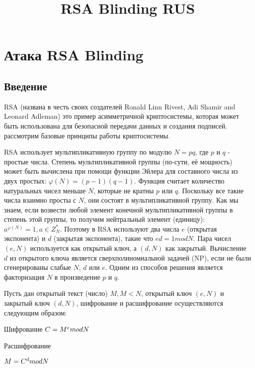 \documentclass[11pt]{article}
\title{RSA Blinding RUS}
\begin{document}
    
    \maketitle
    
    

    
    \section{Атака RSA
Blinding}\label{ux430ux442ux430ux43aux430-rsa-blinding}

\subsection{Введение}\label{ux432ux432ux435ux434ux435ux43dux438ux435}

RSA (названа в честь своих создателей Ronald Linn Rivest, Adi Shamir and
Leonard Adleman) это пример асимметричной криптосистемы, которая может
быть использована для безопасной передачи данных и создания подписей.
рассмотрим базовые принципы работы криптосистемы.

RSA использует мультипликативную группу по модулю \(N=pq\), где \(p\) и
\(q\) - простые числа. Степень мультипликативной группы (по-сути, её
мощность) может быть вычислена при помощи функции Эйлера для составного
числа из двух простых: \(\varphi(N)=(p-1)(q-1)\). Функция считает
количество натуральных чисел меньше \(N\), которые не кратны \(p\) или
\(q\). Поскольку все такие числа взаимно просты с \(N\), они состоят в
мультипликативной группу. Как мы знаем, если возвести любой элемент
конечной мультипликативной группы в степень этой группы, то получим
нейтральный элемент (единицу): \(a^{\varphi(N)}=1, a \in Z^{*}_{N}\).
Поэтому в RSA используют два числа \(e\) (открытая экспонента) и \(d\)
(закрытая экспонента), такие что \(ed=1 mod N\). Пара чисел \((e,N)\)
используется как открытый ключ, а \((d,N)\) как закрытый. Вычисление
\(d\) из открытого ключа является сверхполиномиальной задачей (NP), если
не были сгенерированы слабые \(N\), \(d\) или \(e\). Одним из способов
решения является факторизация \(N\) в произведение \(p\) и \(q\).

Пусть дан открытый текст (число) \(M, M < N\), открытый ключ \((e,N)\) и
закрытый ключ \((d,N)\), шифрование и расшифрование осуществляются
следующим образом:

Шифрование \(C=M^{e}\space mod\space N\)

Расшифрование

\(M=C^{d} \space mod\space N\)
\end{document}
